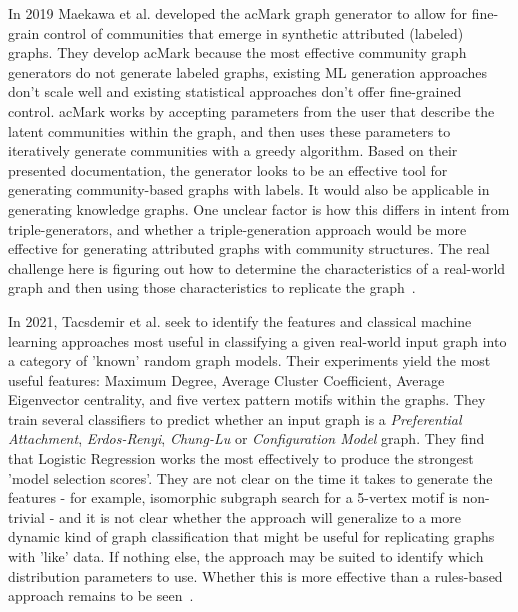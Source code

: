  \par{In 2019 Maekawa et al. developed the acMark graph generator to allow for fine-grain control of communities that emerge in synthetic attributed (labeled) graphs. 
 They develop acMark because the most effective community graph generators do not generate labeled graphs, existing ML generation approaches don't scale well and existing statistical approaches don't offer fine-grained control. 
 acMark works by accepting parameters from the user that describe the latent communities within the graph, and then uses these parameters to iteratively generate communities with a greedy algorithm. 
 Based on their presented documentation, the generator looks to be an effective tool for generating community-based graphs with labels. 
 It would also be applicable in generating knowledge graphs. 
 One unclear factor is how this differs in intent from triple-generators, and whether a triple-generation approach would be more effective for generating attributed graphs with community structures. 
 The real challenge here is figuring out how to determine the characteristics of a real-world graph and then using those characteristics to replicate the graph~\cite{Maekawa2019}.}

 \par{In 2021, Tacsdemir et al. seek to identify the features and classical machine learning approaches most useful in classifying a given real-world input graph into a category of 'known' random graph models. 
 Their experiments yield the most useful features: Maximum Degree, Average Cluster Coefficient, Average Eigenvector centrality, and five vertex pattern motifs within the graphs. 
 They train several classifiers to predict whether an input graph is a \textit{Preferential Attachment}, \textit{Erdos-Renyi}, \textit{Chung-Lu} or \textit{Configuration Model} graph. They find that Logistic Regression works the most effectively to produce the strongest 'model selection scores'. 
 They are not clear on the time it takes to generate the features - for example, isomorphic subgraph search for a 5-vertex motif is non-trivial - and it is not clear whether the approach will generalize to a more dynamic kind of graph classification that might be useful for replicating graphs with 'like' data. 
 If nothing else, the approach may be suited to identify which distribution parameters to use. Whether this is more effective than a rules-based approach remains to be seen~\cite{Tacsdemir2021}.}

